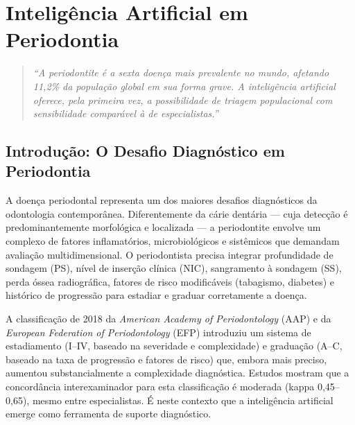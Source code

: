\chapter{Inteligência Artificial em Periodontia}
\label{cap:periodontia-ia}
\niveltres

\begin{quote}
\textit{``A periodontite é a sexta doença mais prevalente no mundo, afetando 11,2\% da população global em sua forma grave. A inteligência artificial oferece, pela primeira vez, a possibilidade de triagem populacional com sensibilidade comparável à de especialistas.''}
\end{quote}

\section{Introdução: O Desafio Diagnóstico em Periodontia}

A doença periodontal representa um dos maiores desafios diagnósticos da odontologia contemporânea. Diferentemente da cárie dentária --- cuja detecção é predominantemente morfológica e localizada --- a periodontite envolve um complexo de fatores inflamatórios, microbiológicos e sistêmicos que demandam avaliação multidimensional. O periodontista precisa integrar profundidade de sondagem (PS), nível de inserção clínica (NIC), sangramento à sondagem (SS), perda óssea radiográfica, fatores de risco modificáveis (tabagismo, diabetes) e histórico de progressão para estadiar e graduar corretamente a doença.

A classificação de 2018 da \textit{American Academy of Periodontology} (AAP) e da \textit{European Federation of Periodontology} (EFP) introduziu um sistema de estadiamento (I--IV, baseado na severidade e complexidade) e graduação (A--C, baseado na taxa de progressão e fatores de risco) que, embora mais preciso, aumentou substancialmente a complexidade diagnóstica. Estudos mostram que a concordância interexaminador para esta classificação é moderada (kappa 0,45--0,65), mesmo entre especialistas. É neste contexto que a inteligência artificial emerge como ferramenta de suporte diagnóstico.


